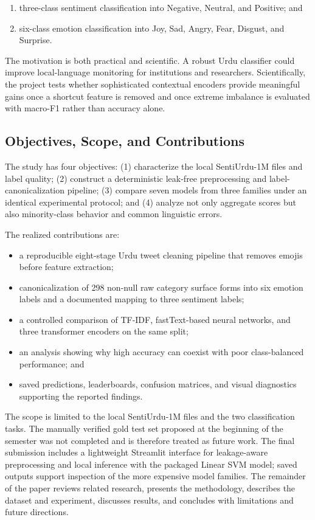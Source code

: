 \documentclass[conference]{IEEEtran}
\begin{document}
\begin{enumerate}[leftmargin=*,nosep]
    \item three-class sentiment classification into Negative, Neutral, and Positive; and
    \item six-class emotion classification into Joy, Sad, Angry, Fear, Disgust, and Surprise.
\end{enumerate}

The motivation is both practical and scientific. A robust Urdu classifier could improve local-language monitoring for institutions and researchers. Scientifically, the project tests whether sophisticated contextual encoders provide meaningful gains once a shortcut feature is removed and once extreme imbalance is evaluated with macro-F1 rather than accuracy alone.

\subsection{Objectives, Scope, and Contributions}

The study has four objectives: (1) characterize the local SentiUrdu-1M files and label quality; (2) construct a deterministic leak-free preprocessing and label-canonicalization pipeline; (3) compare seven models from three families under an identical experimental protocol; and (4) analyze not only aggregate scores but also minority-class behavior and common linguistic errors.

The realized contributions are:

\begin{itemize}[leftmargin=*,nosep]
    \item a reproducible eight-stage Urdu tweet cleaning pipeline that removes emojis before feature extraction;
    \item canonicalization of 298 non-null raw category surface forms into six emotion labels and a documented mapping to three sentiment labels;
    \item a controlled comparison of TF-IDF, fastText-based neural networks, and three transformer encoders on the same split;
    \item an analysis showing why high accuracy can coexist with poor class-balanced performance; and
    \item saved predictions, leaderboards, confusion matrices, and visual diagnostics supporting the reported findings.
\end{itemize}

The scope is limited to the local SentiUrdu-1M files and the two classification tasks. The manually verified gold test set proposed at the beginning of the semester was not completed and is therefore treated as future work. The final submission includes a lightweight Streamlit interface for leakage-aware preprocessing and local inference with the packaged Linear SVM model; saved outputs support inspection of the more expensive model families. The remainder of the paper reviews related research, presents the methodology, describes the dataset and experiment, discusses results, and concludes with limitations and future directions.
\end{document}
